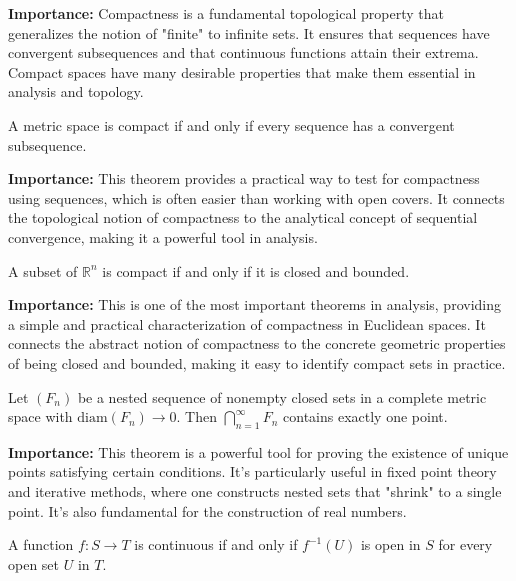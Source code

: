 \noindent\textbf{Importance:} Compactness is a fundamental topological property that generalizes the notion of "finite" to infinite sets. It ensures that sequences have convergent subsequences and that continuous functions attain their extrema. Compact spaces have many desirable properties that make them essential in analysis and topology.



\begin{theorem}
A metric space is compact if and only if every sequence has a convergent subsequence.
\end{theorem}

\noindent\textbf{Importance:} This theorem provides a practical way to test for compactness using sequences, which is often easier than working with open covers. It connects the topological notion of compactness to the analytical concept of sequential convergence, making it a powerful tool in analysis.



\begin{theorem}
A subset of $\mathbb{R}^n$ is compact if and only if it is closed and bounded.
\end{theorem}

\noindent\textbf{Importance:} This is one of the most important theorems in analysis, providing a simple and practical characterization of compactness in Euclidean spaces. It connects the abstract notion of compactness to the concrete geometric properties of being closed and bounded, making it easy to identify compact sets in practice.



\begin{theorem}
Let $(F_n)$ be a nested sequence of nonempty closed sets in a complete metric space with $\text{diam}(F_n) \to 0$. Then $\bigcap_{n=1}^{\infty} F_n$ contains exactly one point.
\end{theorem}

\noindent\textbf{Importance:} This theorem is a powerful tool for proving the existence of unique points satisfying certain conditions. It's particularly useful in fixed point theory and iterative methods, where one constructs nested sets that "shrink" to a single point. It's also fundamental for the construction of real numbers.



\begin{theorem}
A function $f: S \to T$ is continuous if and only if $f^{-1}(U)$ is open in $S$ for every open set $U$ in $T$.
\end{theorem}

